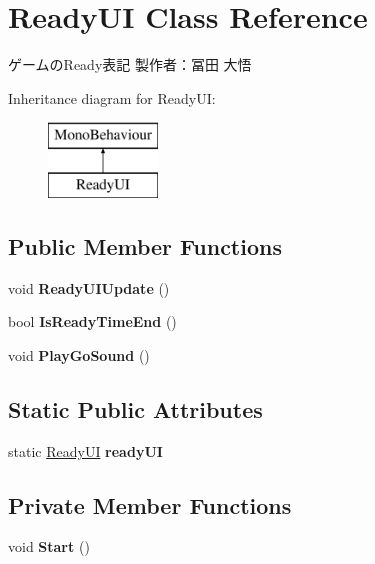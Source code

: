 \hypertarget{class_ready_u_i}{}\section{Ready\+UI Class Reference}
\label{class_ready_u_i}


ゲームの\+Ready表記 製作者：冨田 大悟  


Inheritance diagram for Ready\+UI\+:\begin{figure}[H]
\begin{center}
\leavevmode
\includegraphics[height=2.000000cm]{class_ready_u_i}
\end{center}
\end{figure}
\subsection*{Public Member Functions}
\begin{DoxyCompactItemize}
\item 
\mbox{\label{class_ready_u_i_a2911c9a88c6d44494e5f04c692cb7942}} 
void {\bfseries Ready\+U\+I\+Update} ()
\item 
\mbox{\label{class_ready_u_i_af50bc46352eedbd7c9cfb1c91fb2c504}} 
bool {\bfseries Is\+Ready\+Time\+End} ()
\item 
\mbox{\label{class_ready_u_i_a3eec2a8d130849a55c2e23031ed33801}} 
void {\bfseries Play\+Go\+Sound} ()
\end{DoxyCompactItemize}
\subsection*{Static Public Attributes}
\begin{DoxyCompactItemize}
\item 
\mbox{\label{class_ready_u_i_a71b8d93980f2890b21437e33bd31ec3a}} 
static \hyperlink{class_ready_u_i}{Ready\+UI} {\bfseries ready\+UI}
\end{DoxyCompactItemize}
\subsection*{Private Member Functions}
\begin{DoxyCompactItemize}
\item 
\mbox{\label{class_ready_u_i_a1b61f4ba28b661386ab369dc0b7a8a54}} 
void {\bfseries Start} ()
\end{DoxyCompactItemize}
